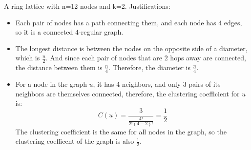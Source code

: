 \documentclass[11pt]{article} %
\begin{document}
\begin{enumerate}
A ring lattice with n=12 nodes and k=2. Justifications:
\begin{itemize}
\item Each pair of nodes has a path connecting them, and each node has 4 edges, so it is a connected 4-regular graph.
\item The longest distance is between the nodes on the opposite side of a diameter, which is $\frac{n}{2}$. And since each pair of nodes that are 2 hops away are connected, the distance between them is $\frac{n}{4}$.  Therefore, the diameter is $\frac{n}{4}$. 
\item For a node in the graph $u$, it has 4 neighbors, and only 3 pairs of its neighbors are themselves connected, therefore, the clustering coefficient for $u$ is: $$C(u)=\frac{3}{\frac{4!}{2!(4-2)!}}=\frac{1}{2}$$ The clustering coefficient is the same for all nodes in the graph, so the clustering coefficent of the graph is also $\frac{1}{2}$.
\end{itemize}


\end{enumerate}
\end{document}
